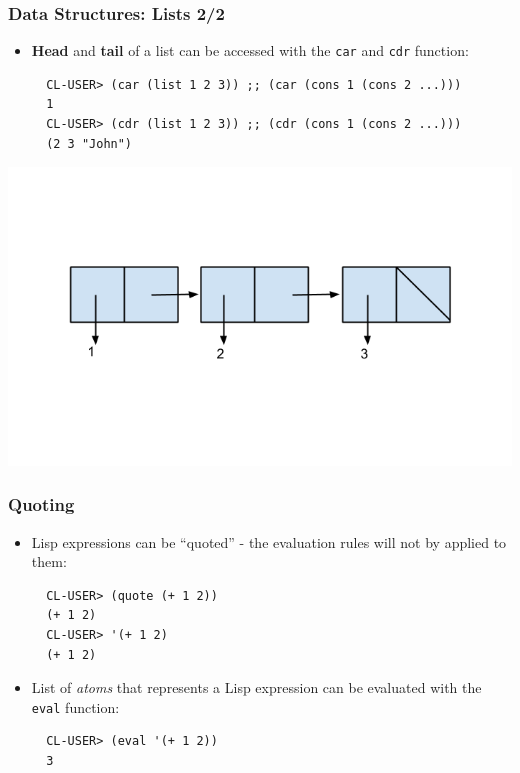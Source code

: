 \documentclass{beamer}
\begin{document}
\begin{frame}[fragile]
  \frametitle{Data Structures: Lists 2/2}
  \begin{itemize}
  \item \textbf{Head} and \textbf{tail} of a list can be accessed with the
    \texttt{car} and \texttt{cdr} function:
\begin{verbatim}
  CL-USER> (car (list 1 2 3)) ;; (car (cons 1 (cons 2 ...)))
  1
  CL-USER> (cdr (list 1 2 3)) ;; (cdr (cons 1 (cons 2 ...)))
  (2 3 "John")
\end{verbatim}
  \end{itemize}
  \includegraphics[width=\columnwidth,trim={0 1cm 0 1cm},clip]{box-and-pointer}
\end{frame}

\begin{frame}[fragile]
  \frametitle{Quoting}
  \begin{itemize}
  \item Lisp expressions can be ``quoted'' - the evaluation rules will not by
    applied to them:
\begin{verbatim}
  CL-USER> (quote (+ 1 2))
  (+ 1 2)
  CL-USER> '(+ 1 2)
  (+ 1 2)
\end{verbatim}
  \item List of \textit{atoms} that represents a Lisp expression can be
    evaluated with the \texttt{eval} function:
\begin{verbatim}
  CL-USER> (eval '(+ 1 2))
  3
\end{verbatim}
  \end{itemize}
\end{frame}
\end{document}
